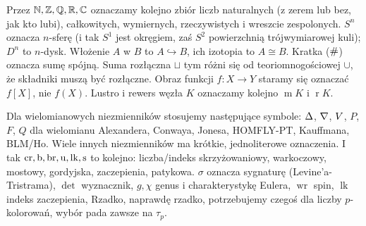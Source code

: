Przez $\mathbb N, \mathbb Z, \mathbb Q, \mathbb R, \mathbb C$ oznaczamy kolejno zbiór liczb naturalnych (z zerem lub bez, jak kto lubi), całkowitych, wymiernych, rzeczywistych i wreszcie zespolonych.
$S^n$ oznacza $n$-sferę (i tak $S^1$ jest okręgiem, zaś $S^2$ powierzchnią trójwymiarowej kuli); $D^n$ to $n$-dysk.
Włożenie $A$ w $B$ to $A \hookrightarrow B$, ich izotopia to $A \cong B$.
Kratka ($\mathbin{\#}$) oznacza sumę spójną.
Suma rozłączna $\sqcup$ tym różni się od teoriomnogościowej $\cup$, że składniki muszą być rozłączne. Obraz funkcji $f \colon X \to Y$ staramy się oznaczać $f[X]$, nie $f(X)$.
Lustro i rewers węzła $K$ oznaczamy kolejno $\operatorname{m} K$ i $\operatorname{r} K$.

Dla wielomianowych niezmienników stosujemy następujące symbole: $\Delta$, $\nabla$, $V$, $P$, $F$, $Q$ dla wielomianu Alexandera, Conwaya, Jonesa, HOMFLY-PT, Kauffmana, BLM/Ho.
Wiele innych niezmienników ma krótkie, jednoliterowe oznaczenia.
I tak $\operatorname{cr}, \operatorname{b}, \operatorname{br}, \operatorname{u}, \operatorname{lk}, \operatorname{s}$ to kolejno: liczba/indeks skrzyżowaniowy, warkoczowy, mostowy, gordyjska, zaczepienia, patykowa.
$\sigma$ oznacza sygnaturę (Levine'a-Tristrama), $\det$ wyznacznik, $g, \chi$ genus i charakterystykę Eulera, $\operatorname{wr}$ spin, $\operatorname{lk}$ indeks zaczepienia, 
Rzadko, naprawdę rzadko, potrzebujemy czegoś dla liczby $p$-kolorowań, wybór pada zawsze na $\tau_p$.


